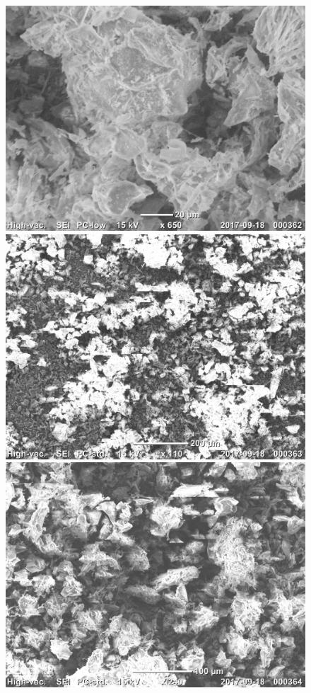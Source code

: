 \documentclass[12pt]{article}
\begin{document}
\begin{figure}[!ht]
	\includegraphics[scale=0.7]{pictures/20170918_000362.jpg}
	\includegraphics[scale=0.7]{pictures/20170918_000363.jpg}
	\includegraphics[scale=0.7]{pictures/20170918_000364.jpg}

\end{figure}
\end{document}
